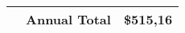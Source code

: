\begin{adjustbox}{angle=90}
\begin{tabularx}{\textheight}{|l||X|m{4cm}|}
                                                       & \textbf{Annual Total}                                                                                                                                                                                                                            & \textbf{\$515,16}                        \\ \hline
\end{tabularx}
\label{tab:azPriceT1_2}
\end{adjustbox}